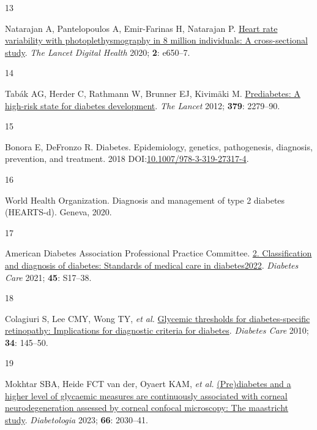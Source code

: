 \documentclass[
  a4paper,
  headsepline=true,
  open=any]{scrbook}
\newlength{\cslhangindent}
\newlength{\csllabelwidth}
\newlength{\cslentryspacingunit} %
\newenvironment{CSLReferences}[2] %
 {%
  \setlength{\parindent}{0pt}
  \ifodd #1
  \let\oldpar\par
  \def\par{\hangindent=\cslhangindent\oldpar}
  \fi
  \setlength{\parskip}{#2\cslentryspacingunit}
 }%
 {}
\newcommand{\CSLLeftMargin}[1]{\parbox[t]{\csllabelwidth}{#1}}
\newcommand{\CSLRightInline}[1]{\parbox[t]{\linewidth - \csllabelwidth}{#1}\break}
\begin{document}
\begin{CSLReferences}{0}{0}
\leavevmode{}%
\CSLLeftMargin{13 }%
\CSLRightInline{Natarajan A, Pantelopoulos A, Emir-Farinas H, Natarajan
P. \href{https://doi.org/10.1016/S2589-7500(20)30246-6}{Heart rate
variability with photoplethysmography in 8 million individuals: A
cross-sectional study}. \emph{The Lancet Digital Health} 2020;
\textbf{2}: e650--7.}

\leavevmode{}%
\CSLLeftMargin{14 }%
\CSLRightInline{Tabák AG, Herder C, Rathmann W, Brunner EJ, Kivimäki M.
\href{https://doi.org/10.1016/S0140-6736(12)60283-9}{Prediabetes: A
high-risk state for diabetes development}. \emph{The Lancet} 2012;
\textbf{379}: 2279--90.}

\leavevmode{}%
\CSLLeftMargin{15 }%
\CSLRightInline{Bonora E, DeFronzo R. Diabetes. Epidemiology, genetics,
pathogenesis, diagnosis, prevention, and treatment. 2018
DOI:\href{https://doi.org/10.1007/978-3-319-27317-4}{10.1007/978-3-319-27317-4}.}

\leavevmode{}%
\CSLLeftMargin{16 }%
\CSLRightInline{World Health Organization. Diagnosis and management of
type 2 diabetes (HEARTS-d). Geneva, 2020.}

\leavevmode{}%
\CSLLeftMargin{17 }%
\CSLRightInline{American Diabetes Association Professional Practice
Committee. \href{https://doi.org/10.2337/dc22-S002}{2. Classification
and diagnosis of diabetes: Standards of medical care in
diabetes{\textemdash}2022}. \emph{Diabetes Care} 2021; \textbf{45}:
S17--38.}

\leavevmode{}%
\CSLLeftMargin{18 }%
\CSLRightInline{Colagiuri S, Lee CMY, Wong TY, \emph{et al.}
\href{https://doi.org/10.2337/dc10-1206}{Glycemic thresholds for
diabetes-specific retinopathy: Implications for diagnostic criteria for
diabetes}. \emph{Diabetes Care} 2010; \textbf{34}: 145--50.}

\leavevmode{}%
\CSLLeftMargin{19 }%
\CSLRightInline{Mokhtar SBA, Heide FCT van der, Oyaert KAM, \emph{et
al.} \href{https://doi.org/10.1007/s00125-023-05986-5}{(Pre)diabetes and
a higher level of glycaemic measures are continuously associated with
corneal neurodegeneration assessed by corneal confocal microscopy: The
maastricht study}. \emph{Diabetologia} 2023; \textbf{66}: 2030--41.}


\end{CSLReferences}
\end{document}
